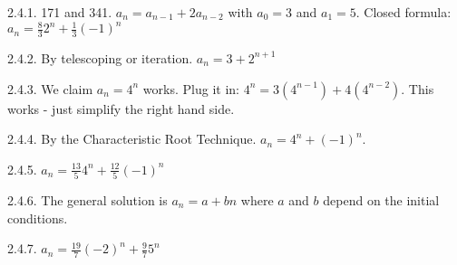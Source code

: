  \protect {} \protect \begin {itemize} 
\begin{ans}{2.4.1.}
		171 and 341.  $a_n = a_{n-1} + 2a_{n-2}$ with $a_0 = 3$ and $a_1 = 5$.  Closed formula: $a_n = \frac{8}{3}2^n + \frac{1}{3}(-1)^n$
	
\end{ans}
\begin{ans}{2.4.2.}
		By telescoping or iteration.  $a_n = 3 + 2^{n+1}$
	
\end{ans}
\begin{ans}{2.4.3.}
		We claim $a_n = 4^n$ works.  Plug it in: $4^n = 3(4^{n-1}) + 4(4^{n-2})$.  This works - just simplify the right hand side.
	
\end{ans}
\begin{ans}{2.4.4.}
		By the Characteristic Root Technique.  $a_n = 4^n + (-1)^n$.
	
\end{ans}
\begin{ans}{2.4.5.}
		$a_n = \frac{13}{5} 4^n + \frac{12}{5} (-1)^n$
	
\end{ans}
\begin{ans}{2.4.6.}
		The general solution is $a_n = a + bn$ where $a$ and $b$ depend on the initial conditions.  %
	
\end{ans}
\begin{ans}{2.4.7.}
		$a_n = \frac{19}{7}(-2)^n + \frac{9}{7}5^n$
	
\end{ans}
\protect \end {itemize}
